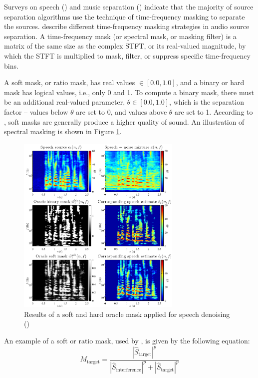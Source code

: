\documentclass[report.tex]{subfiles}
\begin{document}
Surveys on speech (\cite{speechmask}) and music separation (\cite{musicmask}) indicate that the majority of source separation algorithms use the technique of time-frequency masking to separate the sources.  \textcite{masking} describe different time-frequency masking strategies in audio source separation. A time-frequency mask (or spectral mask, or masking filter) is a matrix of the same size as the complex STFT, or its real-valued magnitude, by which the STFT is multiplied to mask, filter, or suppress specific time-frequency bins.

A soft mask, or ratio mask, has real values $\in [0.0, 1.0]$, and a binary or hard mask has logical values, i.e., only 0 and 1. To compute a binary mask, there must be an additional real-valued parameter, $\theta \in [0.0, 1.0]$, which is the separation factor -- values below $\theta$ are set to 0, and values above $\theta$ are set to 1. According to \textcite{masking}, soft masks are generally produce a higher quality of sound. An illustration of spectral masking is shown in Figure \ref{fig:masks}.

\begin{figure}[ht]
	\centering
	\includegraphics[width=0.7\textwidth]{./images-mss/maskdemo.png}
	\caption{Results of a soft and hard oracle mask applied for speech denoising (\cite[71]{masking})}
	\label{fig:masks}
\end{figure}

An example of a soft or ratio mask, used by \textcite{fitzgerald1, fitzgerald2}, is given by the following equation:
\[ M_{\text{target}} = \frac{|\hat{S}_{\text{target}}|^{p}}{|\hat{S}_{\text{interference}}|^{p} + |\hat{S}_{\text{target}}|^{p}} \]
\end{document}
